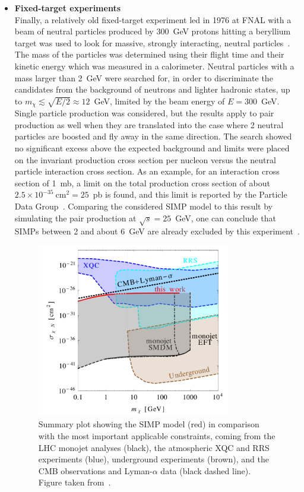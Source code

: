 \begin{itemize}
\item[] \textbf{Fixed-target experiments}\\
Finally, a relatively old fixed-target experiment led in 1976 at FNAL with a beam of neutral particles produced by 300~GeV protons hitting a beryllium target was used to look for massive, strongly interacting, neutral particles~\cite{Gustafson:1976hd}. The mass of the particles was determined using their flight time and their kinetic energy which was measured in a calorimeter. Neutral particles with a mass larger than 2~GeV were searched for, in order to discriminate the candidates from the background of neutrons and lighter hadronic states, up to $m_{\chi} \lesssim \sqrt{E/2} \approx 12$~GeV, limited by the beam energy of $E = 300$~GeV. Single particle production was considered, but the results apply to pair production as well when they are translated into the case where 2 neutral particles are boosted and fly away in the same direction. 
The search showed no significant excess above the expected background and limits were placed on the invariant production cross section per nucleon versus the neutral particle interaction cross section. As an example, for an interaction cross section of 1~mb, a limit on the total production cross section of about $2.5\times10^{-35}\ \mathrm{cm}^2 = 25$~pb is found, and this  limit is reported by the Particle Data Group~\cite{Agashe:2014kda}. Comparing the considered \ac{SIMP} model to this result by simulating the pair production at $\sqrt{s} = 25$~GeV, one can conclude that \acp{SIMP} between 2 and about 6~GeV are already excluded by this experiment~\cite{Daci:2015hca}.

\begin{figure}[ht]
  \centering
  \includegraphics[width=0.8\textwidth]{SIMP_summary.png}\hfill%
  \caption{Summary plot showing the \ac{SIMP} model (red) in comparison with the most important applicable constraints, coming from the LHC monojet analyses (black), the atmospheric XQC and RRS experiments (blue), underground experiments (brown), and the \ac{CMB} observations and Lyman-$\alpha$ data (black dashed line). Figure taken from~\cite{Daci:2015hca}.}
  \label{fig:SIMP_summary}
\end{figure}

\end{itemize}

\clearpage{\pagestyle{empty}\cleardoublepage}
